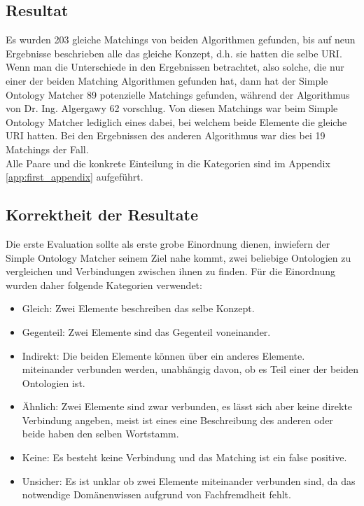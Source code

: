 		\subsection{Resultat}
		Es wurden 203 gleiche Matchings von beiden Algorithmen gefunden, bis auf neun
		Ergebnisse beschrieben alle das gleiche Konzept, d.h. sie hatten die selbe
		URI.
		Wenn man die Unterschiede in den Ergebnissen betrachtet, also solche, die nur
		einer der beiden Matching Algorithmen gefunden hat, dann hat der Simple
		Ontology Matcher 89 potenzielle Matchings gefunden, während der Algorithmus
		von Dr. Ing. Algergawy 62 vorschlug. Von diesen Matchings war beim Simple
		Ontology Matcher lediglich eines dabei, bei welchem beide Elemente die gleiche
		URI hatten. Bei den Ergebnissen des anderen Algorithmus war dies bei 19
		Matchings der Fall.\\
		Alle Paare und die konkrete Einteilung in die Kategorien sind im Appendix
		\ref{app:first_appendix}
		aufgeführt.
		
		\subsection{Korrektheit der Resultate}
		Die erste Evaluation sollte als erste grobe Einordnung dienen, inwiefern
		der Simple Ontology Matcher seinem Ziel nahe kommt, zwei beliebige Ontologien
		zu vergleichen und Verbindungen zwischen ihnen zu finden. Für die Einordnung
		wurden daher folgende Kategorien verwendet:\\
		\begin{itemize}
		  \item Gleich: Zwei Elemente beschreiben das selbe Konzept.
		  \item Gegenteil: Zwei Elemente sind das Gegenteil voneinander.
		  \item Indirekt: Die beiden Elemente können über ein anderes Elemente.
		  miteinander verbunden werden, unabhängig davon, ob es Teil einer der beiden
		  Ontologien ist.
		  \item Ähnlich: Zwei Elemente sind zwar verbunden, es lässt sich aber keine
		  direkte Verbindung angeben, meist ist eines eine Beschreibung des anderen
		  oder beide haben den selben Wortstamm.
		  \item Keine: Es besteht keine Verbindung und das Matching ist ein false
		  positive.
		  \item Unsicher: Es ist unklar ob zwei Elemente miteinander verbunden sind,
		  da das notwendige Domänenwissen aufgrund von Fachfremdheit fehlt.
		\end{itemize}
		
